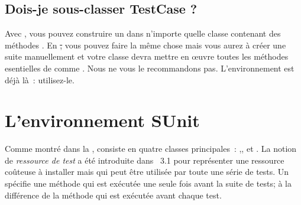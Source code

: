 \documentclass[a4paper,10pt,twoside]{book}
\begin{document}
\subsection{Dois-je sous-classer TestCase ?}
Avec \JUnit{}, vous pouvez construire un  dans n'importe quelle classe contenant des méthodes . En \st, vous pouvez faire la même chose mais vous aurez à créer une suite manuellement et votre classe devra mettre en \oe uvre toutes les méthodes esentielles de  comme .
Nous ne vous le recommandons pas. L'environnement est déjà là~: utilisez-le.
\section{L'environnement SUnit}

Comme montré dans la , \sunit consiste en quatre classes principales~: ,,  et .
La notion de \emph{ressource de test} a été introduite dans \sunit~3.1 pour représenter une ressource coûteuse à installer mais qui peut être utilisée par toute une série de tests. Un  spécifie une méthode  qui est exécutée une seule fois avant la suite de tests; à la différence de la méthode  qui est exécutée avant chaque test.
\end{document}
